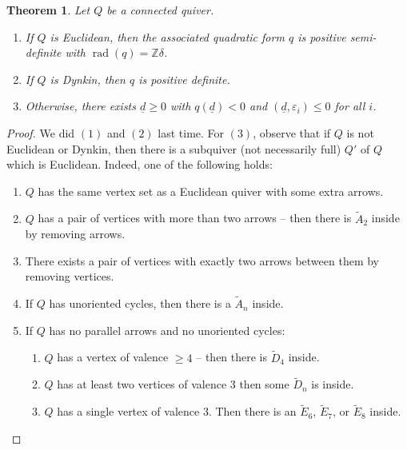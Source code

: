 \documentclass{book}
\newtheorem{theorem}{Theorem}[section]
\DeclareMathOperator{\rad}{rad}
\begin{document}
\begin{theorem}
Let $Q$ be a connected quiver.
\begin{enumerate}
	\item If $Q$ is Euclidean, then the associated quadratic form $q$ is positive semi-definite with $\rad(q) = \mathbb{Z} \delta$.
	\item If $Q$ is Dynkin, then $q$ is positive definite.
	\item Otherwise, there exists $\underline d \geq 0$ with $q(\underline d) < 0$ and $(\underline d, \varepsilon_i) \leq 0$ for all $i$.
\end{enumerate}
\end{theorem}
\begin{proof}
We did $(1)$ and $(2)$ last time. For $(3)$, observe that if $Q$ is not Euclidean or Dynkin, then there is a subquiver (not necessarily full) $Q'$ of $Q$ which is Euclidean. Indeed, one of the following holds:
\begin{enumerate}
	\item $Q$ has the same vertex set as a Euclidean quiver with some extra arrows.
	\item $Q$ has a pair of vertices with more than two arrows -- then there is $\tilde A_2$ inside by removing arrows.
	\item There exists a pair of vertices with exactly two arrows between them by removing vertices.
	\item If $Q$ has unoriented cycles, then there is a $\tilde A_n$ inside.
	\item If $Q$ has no parallel arrows and no unoriented cycles:
	\begin{enumerate}
		\item $Q$ has a vertex of valence $\geq 4$ -- then there is $\tilde D_4$ inside.
		\item $Q$ has at least two vertices of valence 3 then some $\tilde D_n$ is inside.
		\item $Q$ has a single vertex of valence 3. Then there is an $\tilde E_6$, $\tilde E_7$, or $\tilde E_8$ inside.
	\end{enumerate}
\end{enumerate}



\end{proof}
\end{document}
